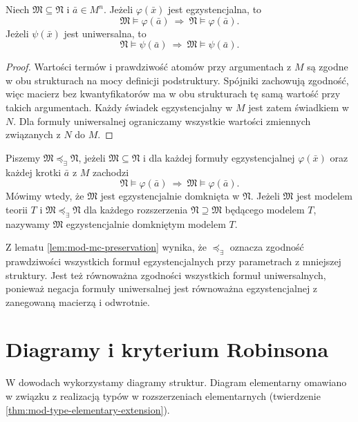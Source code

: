 \begin{lemat}
\label{lem:mod-mc-preservation}
Niech $\mathfrak M\subseteq\mathfrak N$ i $\bar a\in M^n$.
Jeżeli $\varphi(\bar x)$ jest egzystencjalna, to
\[
\mathfrak M\models\varphi(\bar a)
\ \Longrightarrow\
\mathfrak N\models\varphi(\bar a).
\]
Jeżeli $\psi(\bar x)$ jest uniwersalna, to
\[
\mathfrak N\models\psi(\bar a)
\ \Longrightarrow\
\mathfrak M\models\psi(\bar a).
\]
\end{lemat}
\begin{proof}
Wartości termów i prawdziwość atomów przy argumentach
z $M$ są zgodne w obu strukturach na mocy definicji
podstruktury. Spójniki zachowują zgodność, więc
macierz bez kwantyfikatorów ma w obu strukturach
tę samą wartość przy takich argumentach.
Każdy świadek egzystencjalny w $M$ jest zatem świadkiem
w $N$. Dla formuły uniwersalnej ograniczamy wszystkie
wartości zmiennych związanych z $N$ do $M$.
\end{proof}

\begin{definicja}
\label{def:mod-mc-existential-closure}
Piszemy $\mathfrak M\preccurlyeq_{\exists}\mathfrak N$,
jeżeli $\mathfrak M\subseteq\mathfrak N$ i dla każdej
formuły egzystencjalnej $\varphi(\bar x)$ oraz każdej
krotki $\bar a$ z $M$ zachodzi
\[
\mathfrak N\models\varphi(\bar a)
\ \Longrightarrow\
\mathfrak M\models\varphi(\bar a).
\]
Mówimy wtedy, że $\mathfrak M$ jest egzystencjalnie
domknięta w $\mathfrak N$.
Jeżeli $\mathfrak M$ jest modelem teorii $T$ i
$\mathfrak M\preccurlyeq_{\exists}\mathfrak N$ dla każdego
rozszerzenia $\mathfrak N\supseteq\mathfrak M$
będącego modelem $T$, nazywamy
$\mathfrak M$ egzystencjalnie domkniętym modelem $T$.
\end{definicja}

Z lematu \ref{lem:mod-mc-preservation} wynika, że
$\preccurlyeq_{\exists}$ oznacza zgodność prawdziwości
wszystkich formuł egzystencjalnych przy parametrach
z mniejszej struktury. Jest też równoważna zgodności
wszystkich formuł uniwersalnych, ponieważ negacja
formuły uniwersalnej jest równoważna egzystencjalnej
z zanegowaną macierzą i odwrotnie.

\section{Diagramy i kryterium Robinsona}
W dowodach wykorzystamy diagramy struktur. Diagram
elementarny omawiano w związku z realizacją typów
w rozszerzeniach elementarnych (twierdzenie
\ref{thm:mod-type-elementary-extension}).

